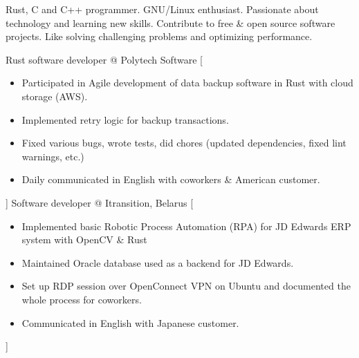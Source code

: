 \documentclass{resume}
\begin{document}
\makeheader


Rust, C and C++ programmer. GNU/Linux enthusiast.
Passionate about technology and learning new skills.
Contribute to free \& open source software projects.
Like solving challenging problems and optimizing performance.

\begin{experiences}
		{Rust software developer @ Polytech Software}%
		[\begin{itemize}
          \item Participated in Agile development of data backup software in Rust with cloud storage (AWS).
          \item Implemented retry logic for backup transactions.
          \item Fixed various bugs, wrote tests, did chores (updated dependencies, fixed lint warnings, etc.)
          \item Daily communicated in English with coworkers \& American customer.
		  \end{itemize}]
		{Software developer @ Itransition, Belarus}%
		[\begin{itemize}
			\item Implemented basic Robotic Process Automation (RPA) for JD Edwards ERP system with OpenCV \& Rust
			\item Maintained Oracle database used as a backend for JD Edwards.
			\item Set up RDP session over OpenConnect VPN on Ubuntu and documented the whole process for coworkers.
			\item Communicated in English with Japanese customer.
		\end{itemize}]
\end{experiences}
\end{document}
